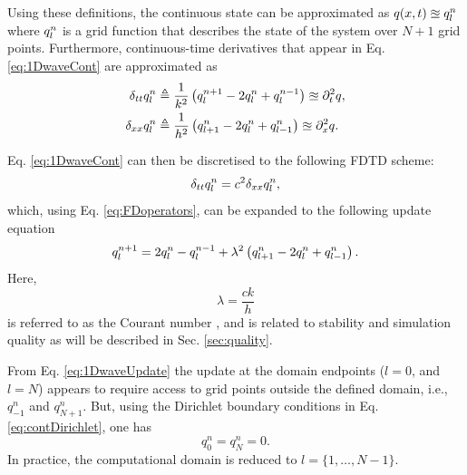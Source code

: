 \documentclass[fleqn]{jaes}
\def\SBcomment[#1]{\textcolor{red}{#1}}
\def\SWcomment[#1]{\textcolor{blue}{#1}}
\begin{document}
Using these definitions, the continuous state can be approximated as $q(x,t) \approxeq q_l^n$ where $q_l^n$ is a grid function that describes the state of the system over $N+1$ grid points. Furthermore, continuous-time derivatives that appear in Eq. \eqref{eq:1DwaveCont} are approximated as
\begin{subequations}{\label{eq:FDoperators}}
\begin{align}
    \dtt \qln &\triangleq \frac{1}{k^2}\left(q_l^{n+1} - 2 \qln + q_l^{n-1}\right)\approxeq\ptt q  ,\\
    \dxx \qln &\triangleq \frac{1}{h^2}\left(q_{l+1}^n - 2 \qln + q_{l-1}^n\right)\approxeq \pxx q .
\end{align}
\end{subequations}

Eq. \eqref{eq:1DwaveCont} can then be discretised to the following FDTD scheme:
\begin{equation}\label{eq:1dWaveDisc}
    \dtt \qln = c^2 \dxx \qln,
\end{equation}
which, using Eq. \eqref{eq:FDoperators}, can be expanded to the following update equation
\begin{equation}\label{eq:1DwaveUpdate}
    q_l^{n+1} = 2 \qln - q_l^{n-1} + \lambda^2 \left(q_{l+1}^n -2\qln + q_{l-1}^n\right).
\end{equation}
Here, 
\begin{equation}\label{eq:courant}
    \lambda = \frac{c k}{h}
\end{equation} is referred to as the Courant number \cite{Courant1928}, and is related to stability and simulation quality as will be described in Sec. \ref{sec:quality}.

From Eq. \eqref{eq:1DwaveUpdate} the update at the domain endpoints ($l=0$, and $l=N$) appears to require access to grid points outside the defined domain, i.e., $q_{-1}^n$ and $q_{N+1}^n$. But, using the Dirichlet boundary conditions in Eq. \eqref{eq:contDirichlet}, one has 
\begin{equation}\label{eq:discDirichlet}
    q_0^n = q_N^n = 0.
\end{equation}
In practice, the computational domain is reduced to $l=\{1, \hdots, N-1\}$. 
\end{document}
